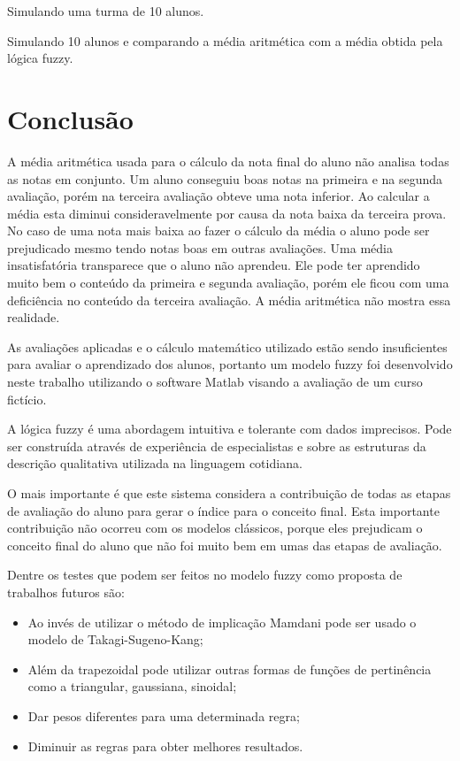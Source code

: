\documentclass{article}
\begin{document}


Simulando uma turma de 10 alunos.



Simulando 10 alunos e comparando a média aritmética com 
a média obtida pela lógica fuzzy.



\section{Conclusão}
A média aritmética usada para o cálculo da nota final
do aluno não analisa todas as notas em conjunto. Um aluno
conseguiu boas notas na primeira e na segunda avaliação, porém
na terceira avaliação obteve uma nota inferior. Ao calcular
a média esta diminui consideravelmente por causa da nota
baixa da terceira prova. No caso de uma nota mais baixa ao
fazer o cálculo da média o aluno pode ser prejudicado mesmo
tendo notas boas em outras avaliações. Uma média insatisfatória
transparece que o aluno não aprendeu. Ele pode ter aprendido
muito bem o conteúdo da primeira e segunda avaliação, porém ele
ficou com uma deficiência no conteúdo da terceira avaliação. A
média aritmética não mostra essa realidade.

As avaliações aplicadas e o cálculo matemático utilizado estão
sendo insuficientes para avaliar o aprendizado dos alunos,
portanto um modelo fuzzy foi desenvolvido neste trabalho
utilizando o software Matlab visando a avaliação de um curso fictício.

A lógica fuzzy é uma abordagem intuitiva e tolerante com dados
imprecisos. Pode ser construída através de experiência de
especialistas e sobre as estruturas da descrição qualitativa
utilizada na linguagem cotidiana.

O mais importante é que este sistema considera a contribuição
de todas as etapas de avaliação do aluno para gerar o índice
para o conceito final. Esta importante contribuição não
ocorreu com os modelos clássicos, porque eles prejudicam o
conceito final do aluno que não foi muito bem em umas das
etapas de avaliação.

Dentre os testes que podem ser feitos no modelo fuzzy como
proposta de trabalhos futuros são:

\begin{itemize}
    \item Ao invés de utilizar o método de implicação
Mamdani pode ser usado o modelo de Takagi-Sugeno-Kang;
    \item Além da trapezoidal pode utilizar outras formas de
    funções de pertinência como a triangular, gaussiana,
    sinoidal;
    \item Dar pesos diferentes para uma determinada regra;
    \item Diminuir as regras para obter melhores resultados.
\end{itemize}



\end{document}
